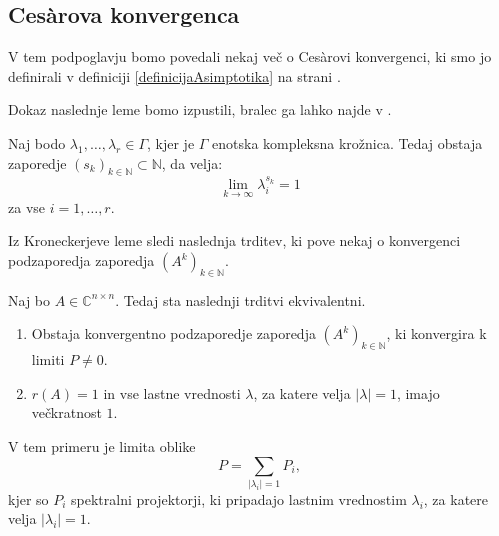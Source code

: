 \documentclass[mat1]{fmfdelo}
\newcommand{\N}{\mathbb N}
\newcommand{\C}{\mathbb C}
\begin{document}
\subsection{Ces\`arova konvergenca}
V tem podpoglavju bomo povedali nekaj več o Ces\`arovi konvergenci, ki smo jo definirali v definiciji \ref{definicijaAsimptotika} na strani \pageref{definicijaAsimptotika}.

Dokaz naslednje leme bomo izpustili, bralec ga lahko najde v \cite[str.~38, lema 3.9]{kramar}.
\begin{lema}[Kronecker]
    Naj bodo $\lambda_1, \ldots, \lambda_r \in \Gamma$, kjer je $\Gamma$ enotska kompleksna krožnica. Tedaj obstaja zaporedje $(s_k)_{k\in\N} \subset \N$, da velja:
    \begin{equation*}
        \lim_{k \rightarrow \infty} \lambda_i^{s_k} = 1
    \end{equation*}
    za vse $i = 1, \ldots, r$.
\end{lema}
Iz Kroneckerjeve leme sledi naslednja trditev, ki pove nekaj o konvergenci podzaporedja zaporedja $(A^k)_{k\in\N}$.
\begin{izrek}\label{izrek310}
    Naj bo $A \in \C^{n \times n}$. Tedaj sta naslednji trditvi ekvivalentni.
    \begin{enumerate}
        \item Obstaja konvergentno podzaporedje zaporedja $(A^k)_{k\in\N}$, ki konvergira k limiti $P \neq 0$.
        \item $r(A) = 1$ in vse lastne vrednosti $\lambda$, za katere velja $|\lambda| = 1$, imajo večkratnost $1$.
    \end{enumerate}
    V tem primeru je limita oblike
    \begin{equation*}
        P = \sum_{|\lambda_i| = 1} P_i,
    \end{equation*}
    kjer so $P_i$ spektralni projektorji, ki pripadajo lastnim vrednostim $\lambda_i$, za katere velja $|\lambda_i| = 1$.
\end{izrek}
\end{document}
